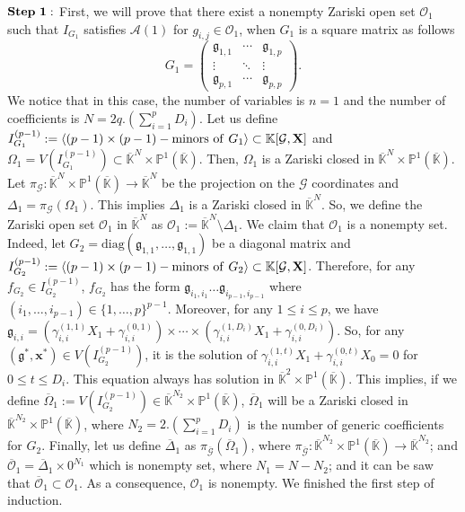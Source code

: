 \documentclass[11pt]{article}
\numberwithin{Property}{section}
\numberwithin{Theorem}{section}
\numberwithin{Proposition}{section}
\numberwithin{Lemma}{section}
\numberwithin{Corollary}{section}
\numberwithin{Definition}{section}
\numberwithin{Remark}{section}
\numberwithin{Conjecture}{section}
\numberwithin{Problem}{section}
\numberwithin{Claim}{section}
\theoremstyle{definition}
\numberwithin{Example}{section}
\renewcommand{\leq}{\leqslant}
\def\bar{\overline}
\newcommand{\field}{\mathbb{K}} %
\newcommand{\mat}[1]{\mathbf{\MakeUppercase{#1}}} %
\begin{document}
$\bf{Step \ 1:}$ First, we will prove that there exist a nonempty Zariski open set  $\mathcal{O}_1$ such that $I_{G_1}$ satisfies $\mathcal{A}(1)$ for $g_{i,j} \in\mathcal{O}_1$, when $G_1$ is a square matrix as follows
\[
G_1 = \left( \begin{matrix}
\mathfrak{g}_{1,1}  & \cdots  & \mathfrak{g}_{1, p}\\
\vdots & \ddots & \vdots \\
\mathfrak{g}_{p,1} & \cdots  & \mathfrak{g}_{p, p}
\end{matrix} \right).
\] We notice that in this case, the number of variables is $n=1$ and the number of coefficients is $N = 2q.(\sum_{i=1}^pD_i)$. Let us define $I_{G_1}^{(p-1)} := \langle (p-1) \times (p-1) - \mathrm{minors \ of \ } G_1 \rangle \subset  \field[\mathcal{G}, \mat{X}]$ and $\Omega_1 = V(I_{G_1}^{(p-1)}) \subset \bar{\field}^{N} \times \mathbb{P}^{1}(\bar{\field})$. Then, $\Omega_1$ is a Zariski closed in $\bar{\field}^{N} \times \mathbb{P}^{1}(\bar{\field})$. Let $\pi_{\mathcal{G}} : \bar{\field}^{N} \times \mathbb{P}^{1}(\bar{\field}) \to \bar{\field}^{N}$ be the projection on the $\mathcal{G}$ coordinates and $\Delta_1 = \pi_{\mathcal{G}}(\Omega_1)$. This implies $\Delta_1$ is a Zariski closed in $\bar{\field}^{N}$. So, we define the Zariski open set $\mathcal{O}_1$ in $\bar{\field}^{N}$ as $\mathcal{O}_1 := \bar{\field}^{N} \setminus \Delta_1$. We claim that $\mathcal{O}_1$ is a nonempty set. Indeed, let $G_2 = \mathrm{diag}(\mathfrak{g}_{1,1}, \ldots, \mathfrak{g}_{1,1})$ be a diagonal matrix and $I_{G_2}^{(p-1)} := \langle (p-1) \times (p-1) - \mathrm{minors \ of \ } G_2 \rangle \subset  \field[\mathcal{G}, \mat{X}]$. Therefore, for any $f_{G_2} \in I_{G_2}^{(p-1)}$, $f_{G_2}$ has the form $\mathfrak{g}_{i_1, i_1} \ldots \mathfrak{g}_{i_{p-1}, i_{p-1}}$ where $(i_1, \ldots, i_{p-1}) \in \{1, \ldots, p\}^{p-1}$. Moreover, for any $1 \leq i \leq p$, we have $\mathfrak{g}_{i,i} = (\gamma_{i,i}^{(1,1)}X_1 + \gamma_{i,i}^{(0,1)}) \times \cdots \times (\gamma_{i,i}^{(1,D_i)}X_1 + \gamma_{i,i}^{(0,D_i)})$. So, for any $(\mathfrak{g}^*, \mathbf{x}^*) \in V(I_{G_2}^{(p-1)})$, it is the solution of $\gamma_{i,i}^{(1,t)}X_1 + \gamma_{i,i}^{(0,t)}X_0 = 0$ for $0 \leq t \leq D_i$. This equation always has solution in $\bar{\field}^{2} \times \mathbb{P}^{1}(\bar{\field})$. This implies, if we define $\bar{\Omega}_1 := V(I_{G_2}^{(p-1)}) \in \bar{\field}^{N_2} \times \mathbb{P}^{1}(\bar{\field})$,  $\bar{\Omega}_1$ will be a Zariski closed in $\bar{\field}^{N_2} \times \mathbb{P}^{1}(\bar{\field})$, where $N_2 = 2.(\sum_{i = 1}^pD_i)$ is the number of generic coefficients for $G_2$. Finally, let us define $\bar{\Delta}_1$ as $\pi_{\bar{\mathcal{G}}}(\bar{\Omega}_1)$, where $\pi_{\bar{\mathcal{G}}} : \bar{\field}^{N_2} \times \mathbb{P}^{1}(\bar{\field}) \to \bar{\field}^{N_2}$; and $\bar{\mathcal{O}}_1 = \bar{\Delta}_1\times 0^{N_1}$ which is nonempty set, where $N_1 = N - N_2$; and it can be saw that 
$\bar{\mathcal{O}}_1 \subset \mathcal{O}_1$. As a consequence,  $\mathcal{O}_1$ is nonempty. We finished the first step of induction. 
\end{document}
